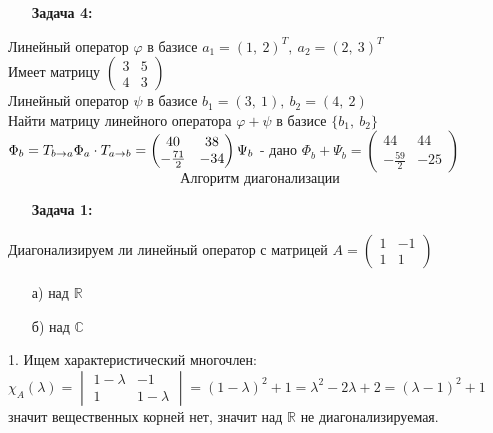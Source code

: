 \documentclass[12pt, letterpaper, twoside]{article}
\begin{document}
        \begin{enumerate}
            \item[\textbf{Задача 4:}]
        \end{enumerate}
        Линейный оператор $\varphi$ в базисе $a_1 = (1,\ 2)^T,\ a_2 = (2,\ 3)^T$\\
        Имеет матрицу $\begin{pmatrix}
            3 & 5\\
            4 & 3
        \end{pmatrix}$\\
        Линейный оператор $\psi$ в базисе $b_1 = (3,\ 1),\ b_2 = (4,\ 2)$\\
        Найти матрицу линейного оператора $\varphi + \psi$ в базисе $\{b_1,\ b_2\}$\\
        $\Phi_b = T_{b\rightarrow a} \Phi_a\cdot T_{a\rightarrow b} = \begin{pmatrix}
            40 & 38\\
            -\frac{71}{2} & -34
        \end{pmatrix}\\
        \Psi_b$ - дано
        $\Phi_b + \Psi_b = \begin{pmatrix}
            44 & 44\\
            -\frac{59}{2} & -25
        \end{pmatrix}$
        \[\text{Алгоритм диагонализации}\]
        \begin{enumerate}
            \item[\textbf{Задача 1:}]
        \end{enumerate}
        Диагонализируем ли линейный оператор с матрицей $A = \begin{pmatrix}
            1 & -1\\
            1 & 1
        \end{pmatrix}$
        \begin{enumerate}
            \item[а)] над $\mathbb{R}$
            \item[б)] над $\mathbb{C}$ 
        \end{enumerate}
        1. Ищем характеристический многочлен:\\
        $\chi_A(\lambda) = \begin{vmatrix}
            1 - \lambda & -1\\
            1 & 1 - \lambda
        \end{vmatrix} = (1 - \lambda)^2 + 1 = \lambda^2 - 2\lambda + 2 = (\lambda - 1)^2 + 1$ значит вещественных корней нет, значит над $\mathbb{R}$ не диагонализируемая.\\
\end{document}
